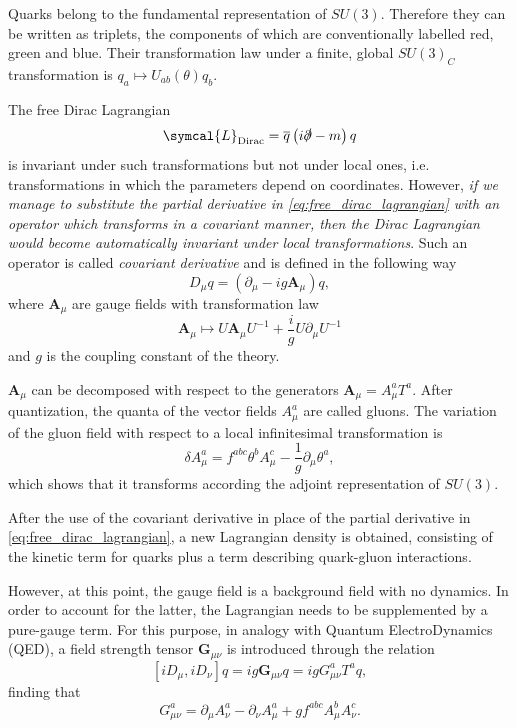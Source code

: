 Quarks belong to the fundamental representation of $SU(3)$. Therefore they can be written as triplets, the components of which are conventionally labelled red, green and blue. Their transformation law under a finite, global $SU(3)_C$ transformation is $ q_a \mapsto U_{a b}(\theta) q_b$.

The free Dirac Lagrangian
\begin{equation}
  \symcal{L}_\text{Dirac} = \adj{q} \left( i \slashed{\partial} - m \right) q
  \label{eq:free_dirac_lagrangian}
\end{equation}
is invariant under such transformations but not under local ones, i.e. transformations in which the parameters depend on coordinates. However, \emph{if we manage to substitute the partial derivative in \eqref{eq:free_dirac_lagrangian} with an operator which transforms in a covariant manner, then the Dirac Lagrangian would become automatically invariant under local transformations}. Such an operator is called \emph{covariant derivative} and is defined in the following way
\begin{equation}
  D_\mu q = \left( \partial_\mu - i g \symbf{A}_\mu \right) q ,
  \label{eq:covariant_derivative}
\end{equation}
where $\symbf{A}_\mu$ are gauge fields with transformation law
\begin{equation}
  \symbf{A}_\mu \mapsto U \symbf{A}_\mu U^{-1} + \frac{i}{g} U \partial_\mu U^{-1} 
\end{equation}
and $g$ is the coupling constant of the theory. 

$\symbf{A}_\mu$ can be decomposed with respect to the generators $\symbf{A}_\mu = A^a_\mu T^a$.  After quantization, the quanta of the vector fields $A^a_\mu$ are called gluons. The variation of the gluon field with respect to a local infinitesimal transformation is
\begin{equation}
  \delta A^a_\mu = f^{a b c} \theta^b A^c_\mu - \frac{1}{g} \partial_\mu \theta^a ,
\end{equation}
which shows that it transforms according the adjoint representation of $SU(3)$.

After the use of the covariant derivative in place of the partial derivative in \eqref{eq:free_dirac_lagrangian}, a new Lagrangian density is obtained, consisting of the kinetic term for quarks plus a term describing quark-gluon interactions. 

However, at this point, the gauge field is a background field with no dynamics. In order to account for the latter, the Lagrangian needs to be supplemented by a pure-gauge term. For this purpose, in analogy with Quantum ElectroDynamics (QED), a field strength tensor $\symbf{G}_{\mu \nu}$ is introduced through the relation
\begin{equation}
  \left[ i D_\mu , i D_\nu \right] q = i g \symbf{G}_{\mu \nu} q = i g G^a_{\mu \nu} T^a q ,
\end{equation}
finding that
\begin{equation}
  G^a_{\mu \nu} = \partial_\mu A^a_\nu - \partial_\nu A^a_\mu + g f^{a b c} A^b_\mu A^c_\nu .
\end{equation}

